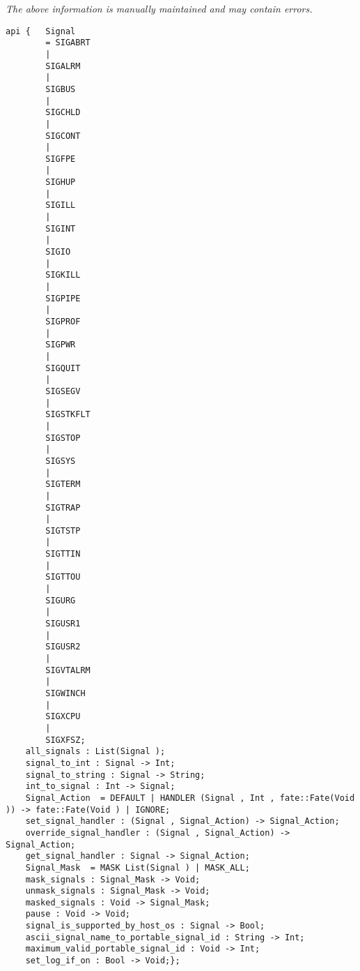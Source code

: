 \label{api:Interprocess\_Signals}

{\tiny \it The above information is manually maintained and may contain errors.}
\begin{verbatim}
api {   Signal
        = SIGABRT
        |
        SIGALRM
        |
        SIGBUS
        |
        SIGCHLD
        |
        SIGCONT
        |
        SIGFPE
        |
        SIGHUP
        |
        SIGILL
        |
        SIGINT
        |
        SIGIO
        |
        SIGKILL
        |
        SIGPIPE
        |
        SIGPROF
        |
        SIGPWR
        |
        SIGQUIT
        |
        SIGSEGV
        |
        SIGSTKFLT
        |
        SIGSTOP
        |
        SIGSYS
        |
        SIGTERM
        |
        SIGTRAP
        |
        SIGTSTP
        |
        SIGTTIN
        |
        SIGTTOU
        |
        SIGURG
        |
        SIGUSR1
        |
        SIGUSR2
        |
        SIGVTALRM
        |
        SIGWINCH
        |
        SIGXCPU
        |
        SIGXFSZ;
    all_signals : List(Signal );
    signal_to_int : Signal -> Int;
    signal_to_string : Signal -> String;
    int_to_signal : Int -> Signal;
    Signal_Action  = DEFAULT | HANDLER (Signal , Int , fate::Fate(Void )) -> fate::Fate(Void ) | IGNORE;
    set_signal_handler : (Signal , Signal_Action) -> Signal_Action;
    override_signal_handler : (Signal , Signal_Action) -> Signal_Action;
    get_signal_handler : Signal -> Signal_Action;
    Signal_Mask  = MASK List(Signal ) | MASK_ALL;
    mask_signals : Signal_Mask -> Void;
    unmask_signals : Signal_Mask -> Void;
    masked_signals : Void -> Signal_Mask;
    pause : Void -> Void;
    signal_is_supported_by_host_os : Signal -> Bool;
    ascii_signal_name_to_portable_signal_id : String -> Int;
    maximum_valid_portable_signal_id : Void -> Int;
    set_log_if_on : Bool -> Void;};
\end{verbatim}
